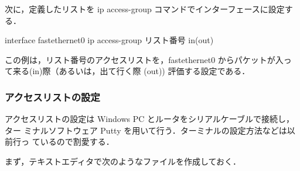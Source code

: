 次に，定義したリストを ip access-group コマンドでインターフェースに設定する．

\begin{cli}
interface fastethernet0
  ip access-group リスト番号 in(out)
\end{cli}

この例は，リスト番号のアクセスリストを，fastethernet0 からパケットが入っ
て来る(in)際（あるいは，出て行く際 (out)) 評価する設定である．

\subsubsection{アクセスリストの設定}
アクセスリストの設定は Windows PC とルータをシリアルケーブルで接続し，ター
ミナルソフトウェア Putty を用いて行う．ターミナルの設定方法などは以前行っ
ているので割愛する．

まず，テキストエディタで次のようなファイルを作成しておく．


